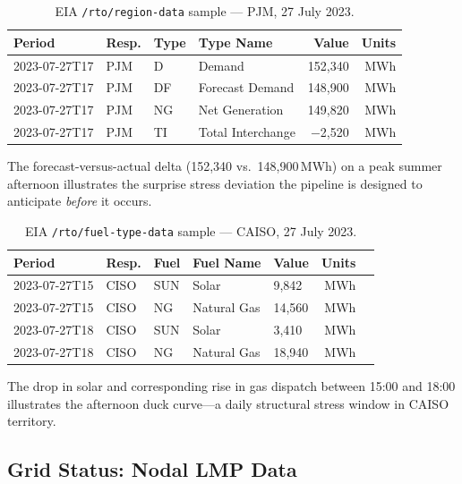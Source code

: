 \documentclass[10pt,letterpaper]{article}
\begin{document}
\begin{table}[H]
\centering
\caption{EIA \texttt{/rto/region-data} sample --- PJM, 27 July 2023.}
\label{tab:eia-demand}
\renewcommand{\arraystretch}{1.2}
\begin{tabular}{@{}llllrr@{}}
\toprule
\textbf{Period} & \textbf{Resp.} & \textbf{Type} & \textbf{Type Name} & \textbf{Value} & \textbf{Units} \\
\midrule
2023-07-27T17 & PJM & D  & Demand           & 152,340 & MWh \\
2023-07-27T17 & PJM & DF & Forecast Demand  & 148,900 & MWh \\
2023-07-27T17 & PJM & NG & Net Generation   & 149,820 & MWh \\
2023-07-27T17 & PJM & TI & Total Interchange& $-$2,520 & MWh \\
\bottomrule
\end{tabular}
\end{table}

The forecast-versus-actual delta (152,340 vs.\ 148,900\,MWh) on a peak summer afternoon
illustrates the surprise stress deviation the pipeline is designed to anticipate \emph{before}
it occurs.

\begin{table}[H]
\centering
\caption{EIA \texttt{/rto/fuel-type-data} sample --- CAISO, 27 July 2023.}
\label{tab:eia-fuel}
\renewcommand{\arraystretch}{1.2}
\begin{tabular}{@{}lllllrr@{}}
\toprule
\textbf{Period} & \textbf{Resp.} & \textbf{Fuel} & \textbf{Fuel Name} & \textbf{Value} & \textbf{Units} \\
\midrule
2023-07-27T15 & CISO & SUN & Solar       &  9,842 & MWh \\
2023-07-27T15 & CISO & NG  & Natural Gas & 14,560 & MWh \\
2023-07-27T18 & CISO & SUN & Solar       &  3,410 & MWh \\
2023-07-27T18 & CISO & NG  & Natural Gas & 18,940 & MWh \\
\bottomrule
\end{tabular}
\end{table}

The drop in solar and corresponding rise in gas dispatch between 15:00 and 18:00 illustrates
the afternoon duck curve---a daily structural stress window in CAISO territory.

\subsection{Grid Status: Nodal LMP Data}
\end{document}
